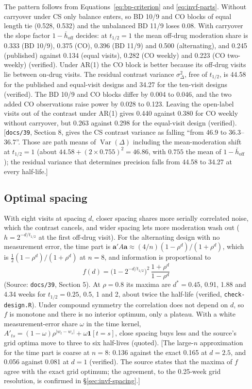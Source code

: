 \documentclass[11pt]{article}
\newcommand{\note}[1]{\textcolor{blue!60!black}{\small [#1]}}
\newcommand{\code}[1]{\texttt{#1}}
\begin{document}
\noindent The pattern follows from Equations~\eqref{eq:bp-criterion}
and \eqref{eq:invf-parts}. Without carryover under CS only balance
enters, so BD 10/9 and CO blocks of equal length tie (0.528, 0.532) and
the unbalanced BD 11/9 loses 0.08. With carryover the slope factor
$1 - \bar h_{\text{off}}$ decides: at $t_{1/2} = 1$ the mean off-drug
moderation share is 0.333 (BD 10/9), 0.375 (CO), 0.396 (BD 11/9) and
0.500 (alternating), and 0.245 (published) against 0.134 (equal visits),
0.282 (CO weekly) and 0.223 (CO two-weekly) (verified). Under AR(1) the
CO block is better because its off-drug visits lie between on-drug
visits. The residual contrast variance $\sigma_\Delta^2$, free of $t_{1/2}$, is
44.58 for the published and equal-visit designs and 34.27 for the
ten-visit designs (verified). The BD 10/9 and CO blocks differ by 0.004
to 0.046, and the two added CO observations raise power by 0.028 to 0.123.
Leaving the open-label visits out of the contrast under AR(1) gives
0.440 against 0.380 for CO weekly without carryover, but 0.263 against
0.298 for the equal-visit design (verified). \note{\code{docs/39},
Section 8, gives the CS contrast variance as falling ``from 46.9 to
36.3--36.7''. Those are path means of $\operatorname{Var}(\Delta)$
including the mean-moderation shift at $t_{1/2} = 1$
(about $44.58 + (2 \times 0.755)^2 = 46.86$, with $0.755$ the mean of
$1 - \bar h_{\text{off}}$); the residual variance that
determines precision falls from 44.58 to 34.27 at every half-life.}

\subsection{Optimal spacing}

With eight visits at spacing $d$, closer spacing shares more serially
correlated noise, which the contrast cancels, and wider spacing lets
more moderation wash out ($h = 2^{-d/t_{1/2}}$ at the first off-drug
visit). For the alternating design with no measurement error, the time
part is $\mathbf a'A\mathbf a \approx (4/n)(1 - \rho^d)/(1 + \rho^d)$,
which is $\tfrac12(1-\rho^d)/(1+\rho^d)$ at $n = 8$, and information is
proportional to
\begin{equation}
f(d) = \big(1 - 2^{-d/t_{1/2}}\big)^2\,\frac{1 + \rho^d}{1 - \rho^d}
\label{eq:bp-spacing}
\end{equation}
(Source: \code{docs/39}, Section 5). At $\rho = 0.8$ its maxima are
$d^* = 0.45$, 0.91, 1.88 and 4.34 weeks for $t_{1/2} = 0.25$, 0.5, 1
and 2, about twice the half-life (verified,
\code{check-design.R}). Under compound symmetry the correlation
does not depend on $d$, so $f$ is monotone and there is no interior
optimum, only a plateau. With a white measurement-error share $\omega$
in the time kernel, $A'_{ts} = (1-\omega)\rho^{|w_t - w_s|} +
\omega\mathbf 1[t = s]$, close spacing buys less and the source's grid
optima move to three to six half-lives (quoted). \note{The large-$n$
approximation for the time part is coarse at $n = 8$: 0.136 against
the exact 0.165 at $d = 2.5$, and 0.056 against 0.081 at $d = 1$
(verified). The source states that the maxima of $f$ agree with the
exact grid optimum; the agreement, to the 0.25-week grid resolution,
is confirmed in \S\ref{sec:invf-spacing}.}
\end{document}
